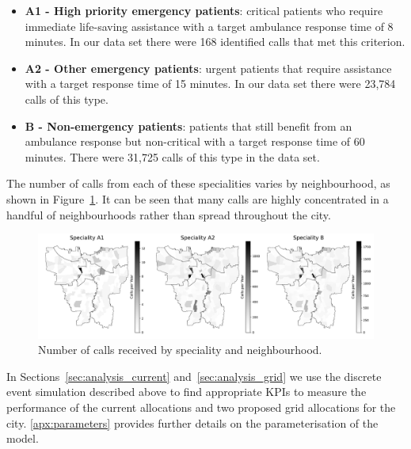 \documentclass[preprint,12pt]{elsarticle}
\begin{document}
\begin{itemize} \item \textbf{A1 - High priority emergency patients}: critical
            patients who require immediate life-saving assistance with a target
            ambulance response time of 8 minutes.  In our data set there were
            168 identified calls that met this criterion.  \item \textbf{A2 -
                Other emergency patients}: urgent patients that require
                assistance with a target response time of 15 minutes. In our
                data set there were 23,784 calls of this type.  \item \textbf{B
                    - Non-emergency patients}: patients that still benefit from
                    an ambulance response but non-critical with a target
                    response time of 60 minutes. There were 31,725 calls of this
                    type in the data set.  \end{itemize}

The number of calls from each of these specialities varies by neighbourhood, as
shown in Figure~\ref{fig:yearly_demand}. It can be seen that many calls are
highly concentrated in a handful of neighbourhoods rather than spread throughout
the city.

\begin{figure} \begin{center}
\includegraphics[width=\textwidth]{img/yearly_demand.pdf} \end{center}
\caption{Number of calls received by speciality and neighbourhood.}
\label{fig:yearly_demand} \end{figure}

In Sections~\ref{sec:analysis_current} and~\ref{sec:analysis_grid} we use the
discrete event simulation described above to find appropriate KPIs to measure
the performance of the current allocations and two proposed grid allocations for
the city. \ref{apx:parameters} provides further details on the parameterisation
of the model.
\end{document}
